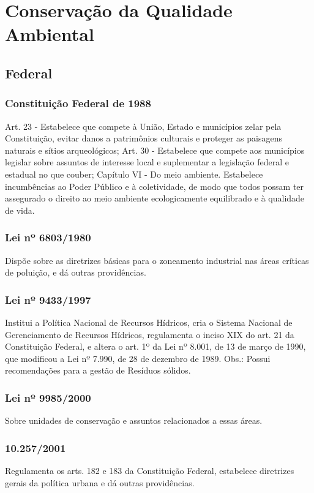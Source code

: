 \section{Conservação da Qualidade Ambiental}

\begin{subapend}
	\subsection{Federal}
	\begin{subsubapend}
		\item \subsubsection{Constituição Federal de 1988}
		Art. 23 - Estabelece que compete à União, Estado e municípios zelar pela Constituição, evitar danos a patrimônios culturais e proteger as paisagens naturais e sítios arqueológicos;
		Art. 30 - Estabelece que compete aos municípios legislar sobre assuntos de interesse local e suplementar a legislação federal e estadual no que couber;
		Capítulo VI - Do meio ambiente. Estabelece incumbências ao Poder Público e à coletividade, de modo que todos possam ter assegurado o direito ao meio ambiente ecologicamente equilibrado e à qualidade de vida.
		\subsubsection{Lei nº 6803/1980}
		Dispõe sobre as diretrizes básicas para o zoneamento industrial nas áreas críticas de poluição, e dá outras providências.
		\subsubsection{Lei nº 9433/1997}
		Institui a Política Nacional de Recursos Hídricos, cria o Sistema Nacional de Gerenciamento de Recursos Hídricos, regulamenta o inciso XIX do art. 21 da Constituição Federal, e altera o art. 1º da Lei nº 8.001, de 13 de março de 1990, que modificou a Lei nº 7.990, de 28 de dezembro de 1989. Obs.: Possui recomendações para a gestão de Resíduos sólidos.
		\subsubsection{Lei nº 9985/2000}
		Sobre unidades de conservação e assuntos relacionados a essas áreas.
		\subsubsection{10.257/2001}
		Regulamenta os arts. 182 e 183 da Constituição Federal, estabelece diretrizes gerais da política urbana e dá outras providências.

\end{subsubapend}
\end{subapend}
